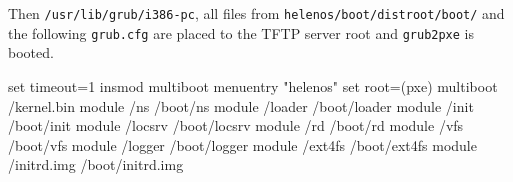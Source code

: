 Then \texttt{/usr/lib/grub/i386-pc}, all files from
\texttt{helenos/boot/distroot/boot/} and the following \texttt{grub.cfg} are
placed to the TFTP server root and \texttt{grub2pxe} is booted.

\begin{bdsh}
set timeout=1
insmod multiboot
menuentry "helenos" {
  set root=(pxe)
  multiboot /kernel.bin
  module    /ns /boot/ns
  module    /loader /boot/loader
  module    /init /boot/init
  module    /locsrv /boot/locsrv
  module    /rd /boot/rd
  module    /vfs /boot/vfs
  module    /logger /boot/logger
  module    /ext4fs /boot/ext4fs
  module    /initrd.img /boot/initrd.img
}
\end{bdsh}
